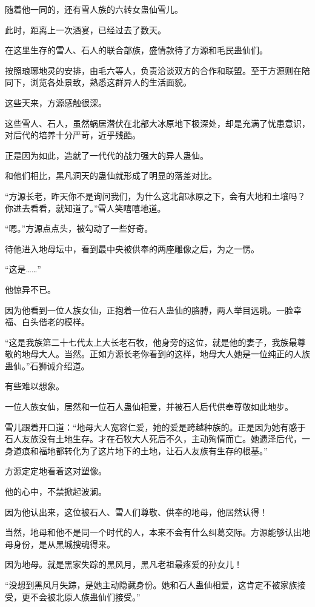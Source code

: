 \begin{this_body}
随着他一同的，还有雪人族的六转女蛊仙雪儿。

此时，距离上一次酒宴，已经过去了数天。

在这里生存的雪人、石人的联合部族，盛情款待了方源和毛民蛊仙们。

按照琅琊地灵的安排，由毛六等人，负责洽谈双方的合作和联盟。至于方源则在陪同下，浏览各处景致，熟悉这群异人的生活面貌。

这些天来，方源感触很深。

这些雪人、石人，虽然蜗居潜伏在北部大冰原地下极深处，却是充满了忧患意识，对后代的培养十分严苛，近乎残酷。

正是因为如此，造就了一代代的战力强大的异人蛊仙。

和他们相比，黑凡洞天的蛊仙就形成了明显的落差对比。

“方源长老，昨天你不是询问我们，为什么这北部冰原之下，会有大地和土壤吗？你进去看看，就知道了。”雪人笑嘻嘻地道。

“嗯。”方源点点头，被勾动了一些好奇。

待他进入地母坛中，看到最中央被供奉的两座雕像之后，为之一愣。

“这是……”

他惊异不已。

因为他看到一位人族女仙，正抱着一位石人蛊仙的胳膊，两人举目远眺。一脸幸福、白头偕老的模样。

“这是我族第二十七代太上大长老石牧，他身旁的这位，就是他的妻子，我族最尊敬的地母大人。当然。正如方源长老你看到的这样，地母大人她是一位纯正的人族蛊仙。”石狮诚介绍道。

有些难以想象。

一位人族女仙，居然和一位石人蛊仙相爱，并被石人后代供奉尊敬如此地步。

雪儿跟着开口道：“地母大人宽容仁爱，她的爱是跨越种族的。正是因为她有感于石人友族没有土地生存。才在石牧大人死后不久，主动殉情而亡。她遗泽后代，一身道痕和福地都转化为了这片地下的土地，让石人友族有生存的根基。”

方源定定地看着这对塑像。

他的心中，不禁掀起波澜。

因为他认出来，这位被石人、雪人们尊敬、供奉的地母，他居然认得！

当然，地母和他不是同一个时代的人，本来不会有什么纠葛交际。方源能够认出地母身份，是从黑城搜魂得来。

因为地母。就是黑家失踪的黑风月，黑凡老祖最疼爱的孙女儿！

“没想到黑风月失踪，是她主动隐藏身份。她和石人蛊仙相爱，这肯定不被家族接受，更不会被北原人族蛊仙们接受。”


\end{this_body}
